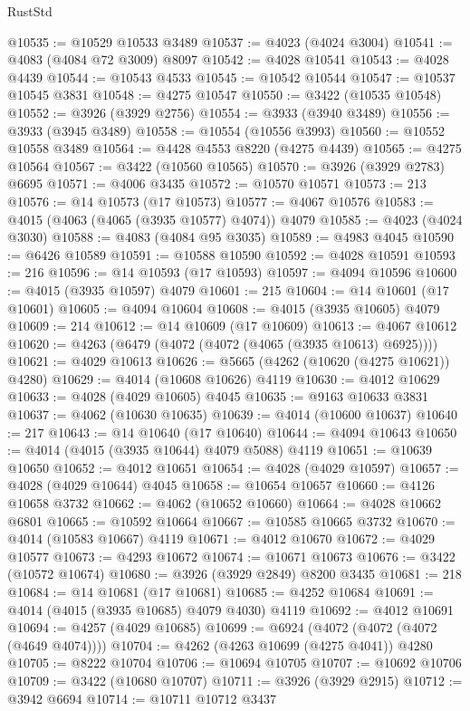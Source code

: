 \begin{lexlean}{RustStd}
\begin{coremodule}
@10535 := @10529 @10533 @3489
@10537 := @4023 (@4024 @3004)
@10541 := @4083 (@4084 @72 @3009) @8097
@10542 := @4028 @10541
@10543 := @4028 @4439
@10544 := @10543 @4533
@10545 := @10542 @10544
@10547 := @10537 @10545 @3831
@10548 := @4275 @10547
@10550 := @3422 (@10535 @10548)
@10552 := @3926 (@3929 @2756)
@10554 := @3933 (@3940 @3489)
@10556 := @3933 (@3945 @3489)
@10558 := @10554 (@10556 @3993)
@10560 := @10552 @10558 @3489
@10564 := @4428 @4553 @8220 (@4275 @4439)
@10565 := @4275 @10564
@10567 := @3422 (@10560 @10565)
@10570 := @3926 (@3929 @2783) @6695
@10571 := @4006 @3435
@10572 := @10570 @10571
@10573 := 213
@10576 := @14 @10573 (@17 @10573)
@10577 := @4067 @10576
@10583 := @4015 (@4063 (@4065 (@3935 @10577) @4074)) @4079
@10585 := @4023 (@4024 @3030)
@10588 := @4083 (@4084 @95 @3035)
@10589 := @4983 @4045
@10590 := @6426 @10589
@10591 := @10588 @10590
@10592 := @4028 @10591
@10593 := 216
@10596 := @14 @10593 (@17 @10593)
@10597 := @4094 @10596
@10600 := @4015 (@3935 @10597) @4079
@10601 := 215
@10604 := @14 @10601 (@17 @10601)
@10605 := @4094 @10604
@10608 := @4015 (@3935 @10605) @4079
@10609 := 214
@10612 := @14 @10609 (@17 @10609)
@10613 := @4067 @10612
@10620 := @4263 (@6479 (@4072 (@4072 (@4065 (@3935 @10613) @6925))))
@10621 := @4029 @10613
@10626 := @5665 (@4262 (@10620 (@4275 @10621)) @4280)
@10629 := @4014 (@10608 @10626) @4119
@10630 := @4012 @10629
@10633 := @4028 (@4029 @10605) @4045
@10635 := @9163 @10633 @3831
@10637 := @4062 (@10630 @10635)
@10639 := @4014 (@10600 @10637)
@10640 := 217
@10643 := @14 @10640 (@17 @10640)
@10644 := @4094 @10643
@10650 := @4014 (@4015 (@3935 @10644) @4079 @5088) @4119
@10651 := @10639 @10650
@10652 := @4012 @10651
@10654 := @4028 (@4029 @10597)
@10657 := @4028 (@4029 @10644) @4045
@10658 := @10654 @10657
@10660 := @4126 @10658 @3732
@10662 := @4062 (@10652 @10660)
@10664 := @4028 @10662 @6801
@10665 := @10592 @10664
@10667 := @10585 @10665 @3732
@10670 := @4014 (@10583 @10667) @4119
@10671 := @4012 @10670
@10672 := @4029 @10577
@10673 := @4293 @10672
@10674 := @10671 @10673
@10676 := @3422 (@10572 @10674)
@10680 := @3926 (@3929 @2849) @8200 @3435
@10681 := 218
@10684 := @14 @10681 (@17 @10681)
@10685 := @4252 @10684
@10691 := @4014 (@4015 (@3935 @10685) @4079 @4030) @4119
@10692 := @4012 @10691
@10694 := @4257 (@4029 @10685)
@10699 := @6924 (@4072 (@4072 (@4072 (@4649 @4074))))
@10704 := @4262 (@4263 @10699 (@4275 @4041)) @4280
@10705 := @8222 @10704
@10706 := @10694 @10705
@10707 := @10692 @10706
@10709 := @3422 (@10680 @10707)
@10711 := @3926 (@3929 @2915)
@10712 := @3942 @6694
@10714 := @10711 @10712 @3437

\end{coremodule}
\end{lexlean}
